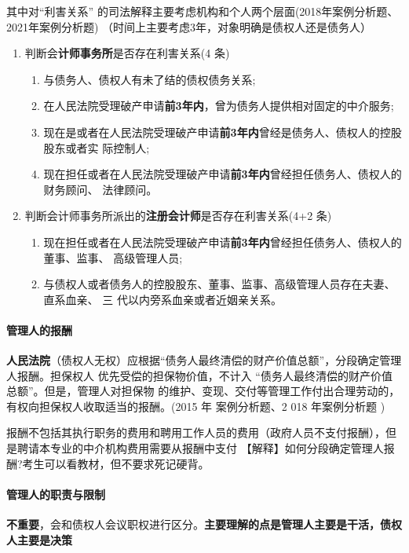 \documentclass[UTF8,12pt]{ctexart}
\numberwithin{equation}{section} %
\numberwithin{figure}{section}
\numberwithin{table}{section}
\begin{document}
	其中对“利害关系” 的司法解释主要考虑机构和个人两个层面(2018年案例分析题、2021年案例分析题) （时间上主要考虑3年，对象明确是债权人还是债务人）
	\begin{enumerate}
		\item 判断会\textbf{计师事务所}是否存在利害关系(4 条)
		\begin{enumerate}
			\item 与债务人、债权人有未了结的债权债务关系;
			
			\item 在人民法院受理破产申请\textbf{前3年内}，曾为债务人提供相对固定的中介服务; 
			
			\item 现在是或者在人民法院受理破产申请\textbf{前3年内}曾经是债务人、债权人的控股股东或者实 际控制人;
			
			\item 现在担任或者在人民法院受理破产申请\textbf{前3年内}曾经担任债务人、债权人的财务顾问、 法律顾问。
		\end{enumerate}
		
		\item 判断会计师事务所派出的\textbf{注册会计师}是否存在利害关系(4+2 条) 
		\begin{enumerate}
			\item 现在担任或者在人民法院受理破产申请\textbf{前3年内}曾经担任债务人、债权人的董事、监事、 高级管理人员; 
			
			\item 与债权人或者债务人的控股股东、董事、监事、高级管理人员存在夫妻、直系血亲、 三 代以内旁系血亲或者近姻亲关系。
		\end{enumerate}
	\end{enumerate}
	
	\paragraph{管理人的报酬}
	
	\textbf{人民法院}（债权人无权）应根据“债务人最终清偿的财产价值总额”，分段确定管理人报酬。担保权人 优先受偿的担保物价值，不计入 “债务人最终清偿的财产价值总额”。但是，管理人对担保物 的维护、变现、交付等管理工作付出合理劳动的，有权向担保权人收取适当的报酬。(2015 年 案例分析题、2 018 年案例分析题 )
	
	报酬不包括其执行职务的费用和聘用工作人员的费用（政府人员不支付报酬），但是聘请本专业的中介机构费用需要从报酬中支付
	【解释】如何分段确定管理人报酬?考生可以看教材，但不要求死记硬背。
	
	\paragraph{管理人的职责与限制}
	\textbf{不重要}，会和债权人会议职权进行区分。\textbf{主要理解的点是管理人主要是干活，债权人主要是决策}
	
\end{document}
